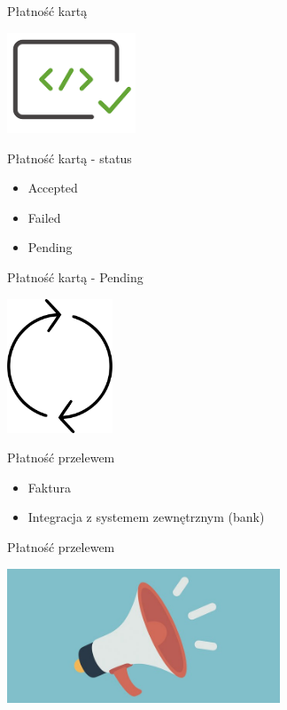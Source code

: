 \documentclass{beamer}
\begin{document}
\begin{frame}{Płatność kartą}
	\begin{center}
		\includegraphics[height=3cm]{response1.png}
	\end{center}
\end{frame}

\begin{frame}{Płatność kartą - status}
	\begin{huge}
		\begin{itemize}[<+->]
			\item Accepted
			\item Failed
			\item Pending
		\end{itemize}
	\end{huge}
\end{frame}

\begin{frame}{Płatność kartą - Pending}
	\begin{center}
		\includegraphics[height=4cm]{cykl1.png}
	\end{center}
\end{frame}

\begin{frame}{Płatność przelewem}
	\begin{huge}
		\begin{itemize}[<+->]
			\item Faktura
			\item Integracja z systemem zewnętrznym (bank)
		\end{itemize}
	\end{huge}
\end{frame}

\begin{frame}{Płatność przelewem}
	\begin{center}
  		\includegraphics[height=4cm]{notification3.jpeg}
	\end{center}
\end{frame}
\end{document}
